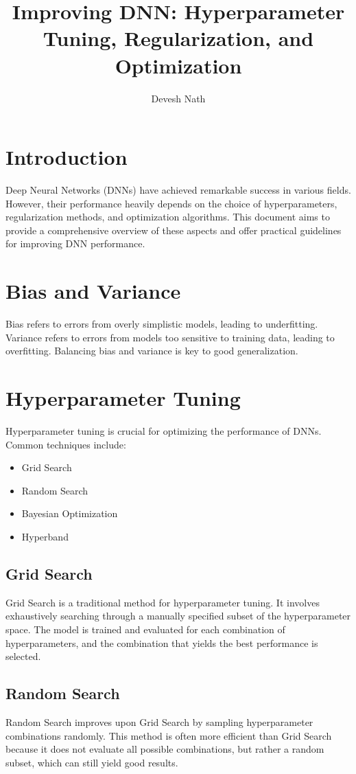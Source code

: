 \documentclass[12pt]{article}
\title{Improving DNN: Hyperparameter Tuning, Regularization, and Optimization}
\author{Devesh Nath}
\date{}
\begin{document}
\maketitle

\section{Introduction}
Deep Neural Networks (DNNs) have achieved remarkable success in various fields. However, their performance heavily depends on the choice of hyperparameters, regularization methods, and optimization algorithms. This document aims to provide a comprehensive overview of these aspects and offer practical guidelines for improving DNN performance.

\section{Bias and Variance}
Bias refers to errors from overly simplistic models, leading to underfitting. Variance refers to errors from models too sensitive to training data, leading to overfitting. Balancing bias and variance is key to good generalization.

\section{Hyperparameter Tuning}
Hyperparameter tuning is crucial for optimizing the performance of DNNs. Common techniques include:
\begin{itemize}
    \item Grid Search
    \item Random Search
    \item Bayesian Optimization
    \item Hyperband
\end{itemize}

\subsection{Grid Search}
Grid Search is a traditional method for hyperparameter tuning. It involves exhaustively searching through a manually specified subset of the hyperparameter space. The model is trained and evaluated for each combination of hyperparameters, and the combination that yields the best performance is selected.

\subsection{Random Search}
Random Search improves upon Grid Search by sampling hyperparameter combinations randomly. This method is often more efficient than Grid Search because it does not evaluate all possible combinations, but rather a random subset, which can still yield good results.
\end{document}
